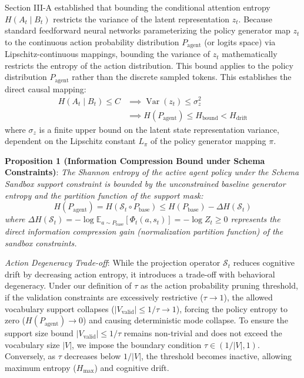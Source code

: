 \documentclass[10pt,journal,compsoc]{IEEEtran}
\begin{document}
Section III-A established that bounding the conditional attention entropy $H(A_t \mid B_t)$ restricts the variance of the latent representation $z_t$. Because standard feedforward neural networks parameterizing the policy generator map $z_t$ to the continuous action probability distribution $P_{\text{agent}}$ (or logits space) via Lipschitz-continuous mappings, bounding the variance of $z_t$ mathematically restricts the entropy of the action distribution. This bound applies to the policy distribution $P_{\text{agent}}$ rather than the discrete sampled tokens. This establishes the direct causal mapping:
\begin{equation}
\begin{split}
H(A_t \mid B_t) \le C &\implies \operatorname{Var}(z_t) \le \sigma_z^2 \\
&\implies H(P_{\text{agent}}) \le H_{\text{bound}} < H_{\text{drift}}
\end{split}
\end{equation}
where $\sigma_z$ is a finite upper bound on the latent state representation variance, dependent on the Lipschitz constant $L_\pi$ of the policy generator mapping $\pi$.

\textbf{Proposition 1 (Information Compression Bound under Schema Constraints)}: \textit{The Shannon entropy of the active agent policy under the Schema Sandbox support constraint is bounded by the unconstrained baseline generator entropy and the partition function of the support mask:}
\begin{equation}
H(P_{\text{agent}}) = H(\mathcal{S}_t \circ P_{\text{base}}) \le H(P_{\text{base}}) - \Delta H(\mathcal{S}_t)
\end{equation}
\textit{where $\Delta H(\mathcal{S}_t) = -\log \mathbb{E}_{a \sim P_{\text{base}}}[\Phi_t(a, s_t)] = -\log Z_t \ge 0$ represents the direct information compression gain (normalization partition function) of the sandbox constraints.}

\textit{Action Degeneracy Trade-off}: While the projection operator $\mathcal{S}_t$ reduces cognitive drift by decreasing action entropy, it introduces a trade-off with behavioral degeneracy. Under our definition of $\tau$ as the action probability pruning threshold, if the validation constraints are excessively restrictive ($\tau \to 1$), the allowed vocabulary support collapses ($|V_{\text{valid}}| \le 1/\tau \to 1$), forcing the policy entropy to zero ($H(P_{\text{agent}}) \to 0$) and causing deterministic mode collapse. To ensure the support size bound $|V_{\text{valid}}| \le 1/\tau$ remains non-trivial and does not exceed the vocabulary size $|V|$, we impose the boundary condition $\tau \in (1/|V|, 1)$. Conversely, as $\tau$ decreases below $1/|V|$, the threshold becomes inactive, allowing maximum entropy ($H_{\max}$) and cognitive drift.
\end{document}
